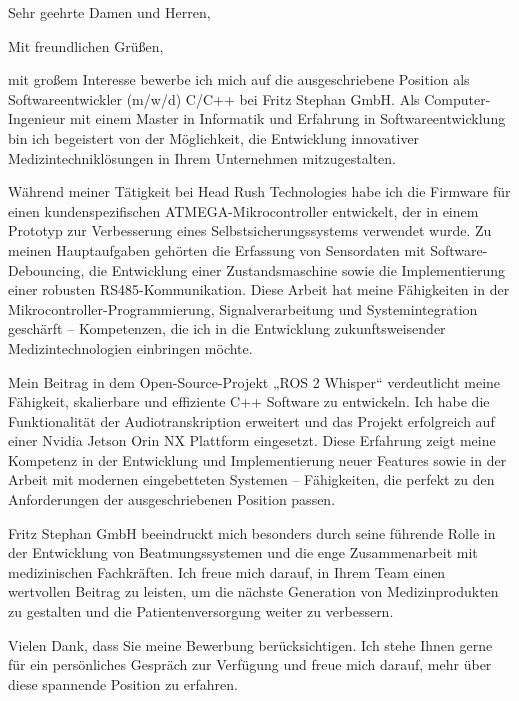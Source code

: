 \documentclass[11pt,a4paper,skipsamekey]{moderncv}
\begin{document}
	\date{\today}
	\opening{Sehr geehrte Damen und Herren,}
	\closing{Mit freundlichen Grüßen,}
	\makelettertitle
	
mit großem Interesse bewerbe ich mich auf die ausgeschriebene Position als Softwareentwickler (m/w/d) C/C++ bei Fritz Stephan GmbH. Als Computer-Ingenieur mit einem Master in Informatik und Erfahrung in Softwareentwicklung bin ich begeistert von der Möglichkeit, die Entwicklung innovativer Medizintechniklösungen in Ihrem Unternehmen mitzugestalten.

Während meiner Tätigkeit bei Head Rush Technologies habe ich die Firmware für einen kundenspezifischen ATMEGA-Mikrocontroller entwickelt, der in einem Prototyp zur Verbesserung eines Selbstsicherungssystems verwendet wurde. Zu meinen Hauptaufgaben gehörten die Erfassung von Sensordaten mit Software-Debouncing, die Entwicklung einer Zustandsmaschine sowie die Implementierung einer robusten RS485-Kommunikation. Diese Arbeit hat meine Fähigkeiten in der Mikrocontroller-Programmierung, Signalverarbeitung und Systemintegration geschärft – Kompetenzen, die ich in die Entwicklung zukunftsweisender Medizintechnologien einbringen möchte.

Mein Beitrag in dem Open-Source-Projekt „ROS 2 Whisper“ verdeutlicht meine Fähigkeit, skalierbare und effiziente C++ Software zu entwickeln.  Ich habe die Funktionalität der Audiotranskription erweitert und das Projekt erfolgreich auf einer Nvidia Jetson Orin NX Plattform eingesetzt.  Diese Erfahrung zeigt meine Kompetenz in der Entwicklung und Implementierung neuer Features sowie in der Arbeit mit modernen eingebetteten Systemen – Fähigkeiten, die perfekt zu den Anforderungen der ausgeschriebenen Position passen.

Fritz Stephan GmbH beeindruckt mich besonders durch seine führende Rolle in der Entwicklung von Beatmungssystemen und die enge Zusammenarbeit mit medizinischen Fachkräften. Ich freue mich darauf, in Ihrem Team einen wertvollen Beitrag zu leisten, um die nächste Generation von Medizinprodukten zu gestalten und die Patientenversorgung weiter zu verbessern.

Vielen Dank, dass Sie meine Bewerbung berücksichtigen. Ich stehe Ihnen gerne für ein persönliches Gespräch zur Verfügung und freue mich darauf, mehr über diese spannende Position zu erfahren.
	
	
	
	\vspace{0.5cm}
\makeletterclosing
\end{document}
